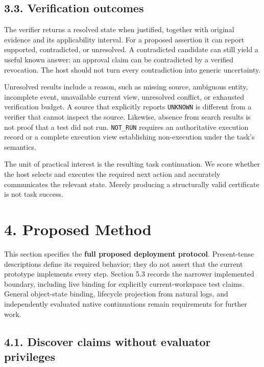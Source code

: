 \documentclass[
  11pt,
  a4paper,
]{article}
\begin{document}
\subsection{3.3. Verification outcomes}\label{verification-outcomes}

The verifier returns a resolved state when justified, together with
original evidence and its applicability interval. For a proposed
assertion it can report supported, contradicted, or unresolved. A
contradicted candidate can still yield a useful known answer: an
approval claim can be contradicted by a verified revocation. The host
should not turn every contradiction into generic uncertainty.

Unresolved results include a reason, such as missing source, ambiguous
entity, incomplete event, unavailable current view, unresolved conflict,
or exhausted verification budget. A source that explicitly reports
\texttt{UNKNOWN} is different from a verifier that cannot inspect the
source. Likewise, absence from search results is not proof that a test
did not run. \texttt{NOT\_RUN} requires an authoritative execution
record or a complete execution view establishing non-execution under the
task's semantics.

The unit of practical interest is the resulting task continuation. We
score whether the host selects and executes the required next action and
accurately communicates the relevant state. Merely producing a
structurally valid certificate is not task success.

\section{4. Proposed Method}\label{proposed-method}

This section specifies the \textbf{full proposed deployment protocol}.
Present-tense descriptions define its required behavior; they do not
assert that the current prototype implements every step. Section 5.3
records the narrower implemented boundary, including live binding for
explicitly current-workspace test claims. General object-state binding,
lifecycle projection from natural logs, and independently evaluated
native continuations remain requirements for further work.

\subsection{4.1. Discover claims without evaluator
privileges}\label{discover-claims-without-evaluator-privileges}
\end{document}
